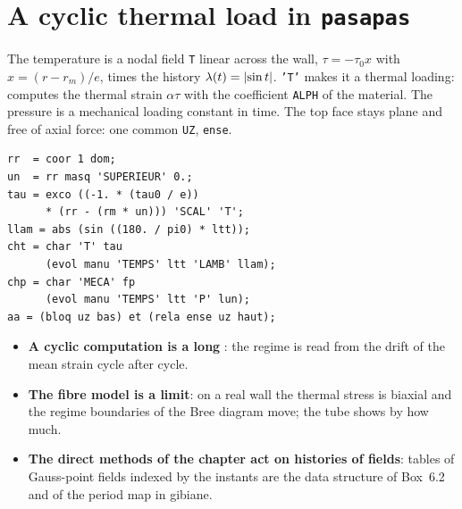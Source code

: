 \section{A cyclic thermal load in \texttt{pasapas}}\label{cc:sec6-thermal}
%
\begin{castemcom}
The temperature is a nodal field \texttt{T} linear across the wall,
$\tau=-\tau_0x$ with $x=(r-r_m)/e$, times the history $\lambda(t)=\lvert \sin t\rvert$.
 \texttt{'T'} makes it a thermal loading:  computes the
thermal strain $\alpha\tau$ with the coefficient \texttt{ALPH} of the material.
The pressure is a mechanical loading constant in time. The top face stays
plane and free of axial force: one common \texttt{UZ}, 
\texttt{ense}.
\end{castemcom}
\begin{castemlines}
\begin{verbatim}
rr  = coor 1 dom;
un  = rr masq 'SUPERIEUR' 0.;
tau = exco ((-1. * (tau0 / e))
      * (rr - (rm * un))) 'SCAL' 'T';
llam = abs (sin ((180. / pi0) * ltt));
cht = char 'T' tau
      (evol manu 'TEMPS' ltt 'LAMB' llam);
chp = char 'MECA' fp
      (evol manu 'TEMPS' ltt 'P' lun);
aa = (bloq uz bas) et (rela ense uz haut);
\end{verbatim}
\end{castemlines}


\begin{gbox*}
\begin{itemize}
\item \textbf{A cyclic computation is a long }: the regime is
  read from the drift of the mean strain cycle after cycle.
\item \textbf{The fibre model is a limit}: on a real wall the thermal stress is
  biaxial and the regime boundaries of the Bree diagram move; the tube shows by
  how much.
\item \textbf{The direct methods of the chapter act on histories of fields}:
  tables of Gauss-point fields indexed by the instants are the data structure
  of Box~6.2 and of the period map in gibiane.
\end{itemize}
\end{gbox*}


